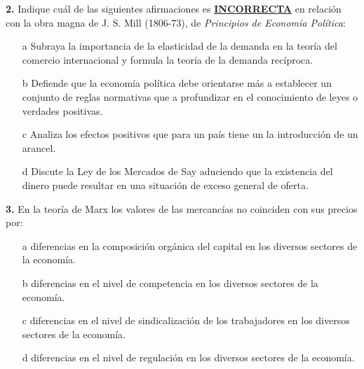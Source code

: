 \documentclass{nuevotema}
\begin{document}
\preguntas

\textbf{2.} Indique cuál de las siguientes afirmaciones es \underline{\textbf{INCORRECTA}} en relación con la obra magna de J. S. Mill (1806-73), de \textit{Principios de Economía Política}:

\begin{itemize}
	\item[a] Subraya la importancia de la elasticidad de la demanda en la teoría del comercio internacional y formula la teoría de la demanda recíproca.
	\item[b] Defiende que la economía política debe orientarse más a establecer un conjunto de reglas normativas que a profundizar en el conocimiento de leyes o verdades positivas.
	\item[c] Analiza los efectos positivos que para un país tiene un la introducción de un arancel.
	\item[d] Discute la Ley de los Mercados de Say aduciendo que la existencia del dinero puede resultar en una situación de exceso general de oferta.
\end{itemize}

\textbf{3.} En la teoría de Marx los valores de las mercancías no coinciden con sus precios por:
\begin{itemize}
	\item[a] diferencias en la composición orgánica del capital en los diversos sectores de la economía.
	\item[b] diferencias en el nivel de competencia en los diversos sectores de la economía.
	\item[c] diferencias en el nivel de sindicalización de los trabajadores en los diversos sectores de la economía.
	\item[d] diferencias en el nivel de regulación en los diversos sectores de la economía.
\end{itemize}
\end{document}
